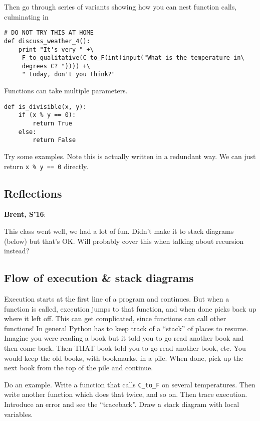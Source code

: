\documentclass{article}
\newenvironment{reflect}[1]
{
  \noindent
  \begin{lrbox}{\reflectbox}
    \begin{minipage}[t]{\textwidth}
      \textbf{#1}:
}{
    \end{minipage}
  \end{lrbox}
  \fbox{\usebox{\reflectbox}}
}
\begin{document}
Then go through series of variants showing how you can nest function
calls, culminating in

\begin{verbatim}
# DO NOT TRY THIS AT HOME
def discuss_weather_4():
    print "It's very " +\
     F_to_qualitative(C_to_F(int(input("What is the temperature in\
     degrees C? ")))) +\
     " today, don't you think?"
\end{verbatim}

Functions can take multiple parameters.

\begin{verbatim}
def is_divisible(x, y):
    if (x % y == 0):
        return True
    else:
        return False
\end{verbatim}

Try some examples.  Note this is actually written in a redundant way.  We
can just return \verb|x % y == 0| directly.

\subsection*{Reflections}

\begin{reflect}{Brent, S'16}
  This class went well, we had a lot of fun.  Didn't make it to stack
  diagrams (below) but that's OK.  Will probably cover this when
  talking about recursion instead?
\end{reflect}

\subsection*{Flow of execution \& stack diagrams}

Execution starts at the first line of a program and continues.  But
when a function is called, execution jumps to that function, and when
done picks back up where it left off.  This can get complicated, since
functions can call other functions!  In general Python has to keep
track of a ``stack'' of places to resume.  Imagine you were reading a
book but it told you to go read another book and then come back.  Then
THAT book told you to go read another book, etc.  You would keep the
old books, with bookmarks, in a pile.  When done, pick up the next
book from the top of the pile and continue.

Do an example. Write a function that calls \verb|C_to_F| on several
temperatures.  Then write another function which does that twice, and
so on.  Then trace execution.  Introduce an error and see the
``traceback''.  Draw a stack diagram with local variables.
\end{document}
